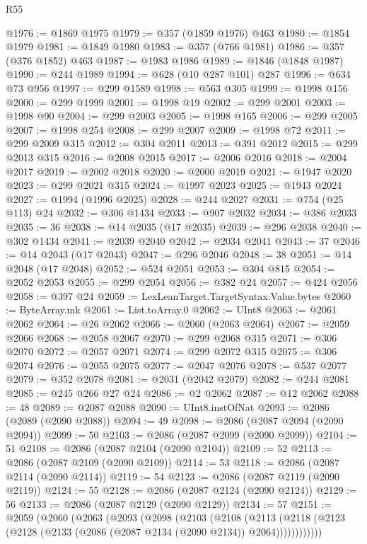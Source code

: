 \begin{lexlean}{R55}
\begin{coremodule}
@1976 := @1869 @1975
@1979 := @357 (@1859 @1976) @463
@1980 := @1854 @1979
@1981 := @1849 @1980
@1983 := @357 (@766 @1981)
@1986 := @357 (@376 @1852) @463
@1987 := @1983 @1986
@1989 := @1846 (@1848 @1987)
@1990 := @244 @1989
@1994 := @628 (@10 @287 @101) @287
@1996 := @634 @73 @956
@1997 := @299 @1589
@1998 := @563 @305
@1999 := @1998 @156
@2000 := @299 @1999
@2001 := @1998 @19
@2002 := @299 @2001
@2003 := @1998 @90
@2004 := @299 @2003
@2005 := @1998 @165
@2006 := @299 @2005
@2007 := @1998 @254
@2008 := @299 @2007
@2009 := @1998 @72
@2011 := @299 @2009 @315
@2012 := @304 @2011
@2013 := @391 @2012
@2015 := @299 @2013 @315
@2016 := @2008 @2015
@2017 := @2006 @2016
@2018 := @2004 @2017
@2019 := @2002 @2018
@2020 := @2000 @2019
@2021 := @1947 @2020
@2023 := @299 @2021 @315
@2024 := @1997 @2023
@2025 := @1943 @2024
@2027 := @1994 (@1996 @2025)
@2028 := @244 @2027
@2031 := @754 (@25 @113) @24
@2032 := @306 @1434
@2033 := @907 @2032
@2034 := @386 @2033
@2035 := 36
@2038 := @14 @2035 (@17 @2035)
@2039 := @296 @2038
@2040 := @302 @1434
@2041 := @2039 @2040
@2042 := @2034 @2041
@2043 := 37
@2046 := @14 @2043 (@17 @2043)
@2047 := @296 @2046
@2048 := 38
@2051 := @14 @2048 (@17 @2048)
@2052 := @524 @2051
@2053 := @304 @815
@2054 := @2052 @2053
@2055 := @299 @2054
@2056 := @382 @24
@2057 := @424 @2056
@2058 := @397 @24
@2059 := LexLeanTarget.TargetSyntax.Value.bytes
@2060 := ByteArray.mk
@2061 := List.toArray.{0}
@2062 := UInt8
@2063 := @2061 @2062
@2064 := @26 @2062
@2066 := @2060 (@2063 @2064)
@2067 := @2059 @2066
@2068 := @2058 @2067
@2070 := @299 @2068 @315
@2071 := @306 @2070
@2072 := @2057 @2071
@2074 := @299 @2072 @315
@2075 := @306 @2074
@2076 := @2055 @2075
@2077 := @2047 @2076
@2078 := @537 @2077
@2079 := @352 @2078
@2081 := @2031 (@2042 @2079)
@2082 := @244 @2081
@2085 := @245 @266 @27 @24
@2086 := @2 @2062
@2087 := @12 @2062
@2088 := 48
@2089 := @2087 @2088
@2090 := UInt8.instOfNat
@2093 := @2086 (@2089 (@2090 @2088))
@2094 := 49
@2098 := @2086 (@2087 @2094 (@2090 @2094))
@2099 := 50
@2103 := @2086 (@2087 @2099 (@2090 @2099))
@2104 := 51
@2108 := @2086 (@2087 @2104 (@2090 @2104))
@2109 := 52
@2113 := @2086 (@2087 @2109 (@2090 @2109))
@2114 := 53
@2118 := @2086 (@2087 @2114 (@2090 @2114))
@2119 := 54
@2123 := @2086 (@2087 @2119 (@2090 @2119))
@2124 := 55
@2128 := @2086 (@2087 @2124 (@2090 @2124))
@2129 := 56
@2133 := @2086 (@2087 @2129 (@2090 @2129))
@2134 := 57
@2151 := @2059
    (@2060
      (@2063
        (@2093
          (@2098
            (@2103
              (@2108
                (@2113
                  (@2118 (@2123 (@2128 (@2133 (@2086 (@2087 @2134 (@2090 @2134)) @2064))))))))))))

\end{coremodule}
\end{lexlean}
